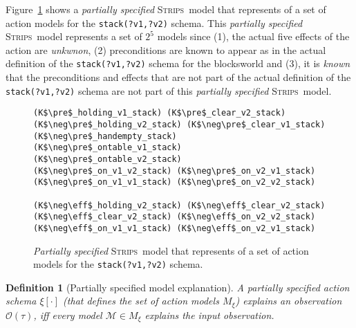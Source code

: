 \documentclass{article}
\newcommand{\pre}{\mathsf{pre}}     %
\newcommand{\eff}{\mathsf{eff}}     %
\newcommand{\strips}{\textsc{Strips}}
\newtheorem{definition}[theorem]{Definition}
\begin{document}
Figure~\ref{fig:partial} shows a {\em partially specified} \strips\ model that represents of a set of action models for the {\tt\small stack(?v1,?v2)} schema. This {\em partially specified} \strips\ model represents a set of $2^5$ models since (1), the actual five effects of the action are {\em unkwnon}, (2) preconditions are known to appear as in the actual definition of the {\tt\small stack(?v1,?v2)} schema for the blocksworld and (3), it is {\em known} that the preconditions and effects that are not part of the actual definition of the {\tt\small stack(?v1,?v2)} schema are not part of this {\em partially specified} \strips\ model.

\begin{figure}
  \begin{tiny}  
 \begin{lstlisting}
(K$\pre$_holding_v1_stack) (K$\pre$_clear_v2_stack)
(K$\neg\pre$_holding_v2_stack) (K$\neg\pre$_clear_v1_stack)
(K$\neg\pre$_handempty_stack) 
(K$\neg\pre$_ontable_v1_stack) (K$\neg\pre$_ontable_v2_stack)
(K$\neg\pre$_on_v1_v2_stack) (K$\neg\pre$_on_v2_v1_stack)
(K$\neg\pre$_on_v1_v1_stack) (K$\neg\pre$_on_v2_v2_stack) 

(K$\neg\eff$_holding_v2_stack) (K$\neg\eff$_clear_v2_stack)
(K$\neg\eff$_clear_v2_stack) (K$\neg\eff$_on_v2_v2_stack)
(K$\neg\eff$_on_v1_v1_stack) (K$\neg\eff$_on_v2_v1_stack)
  \end{lstlisting}           
  \end{tiny}  
 \caption{\small {\em Partially specified} \strips\ model that represents of a set of action models for the {\tt\small stack(?v1,?v2)} schema.}
\label{fig:partial}
\end{figure}

\begin{definition}[Partially specified model explanation]
A partially specified action schema $\xi[\cdot]$ (that defines the set of action models $M_\xi$) {\em explains} an observation $\mathcal{O}(\tau)$, iff every model $\mathcal{M}\in M_{\xi}$ {\em explains} the input observation.
\end{definition}
\end{document}
